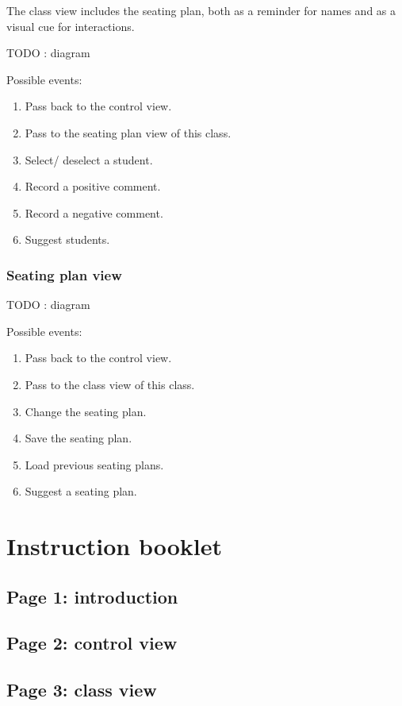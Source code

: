 \documentclass[10pt]{article}
\begin{document}
The class view includes the seating plan, both as a reminder for names and as a visual cue for interactions.

TODO : diagram

Possible events: 
\begin{enumerate}
\item Pass back to the control view.
\item Pass to the seating plan view of this class.
\item Select/ deselect a student.
\item Record a positive comment.
\item Record a negative comment.
\item Suggest students.
\end{enumerate}

\subsubsection{Seating plan view}

TODO : diagram

Possible events: 
\begin{enumerate}
\item Pass back to the control view.
\item Pass to the class view of this class.
\item Change the seating plan.
\item Save the seating plan.
\item Load previous seating plans.
\item Suggest a seating plan.
\end{enumerate}




\section{Instruction booklet} \label{instructions}

\subsection{Page 1: introduction}

\subsection{Page 2: control view}

\subsection{Page 3: class view}
\end{document}
